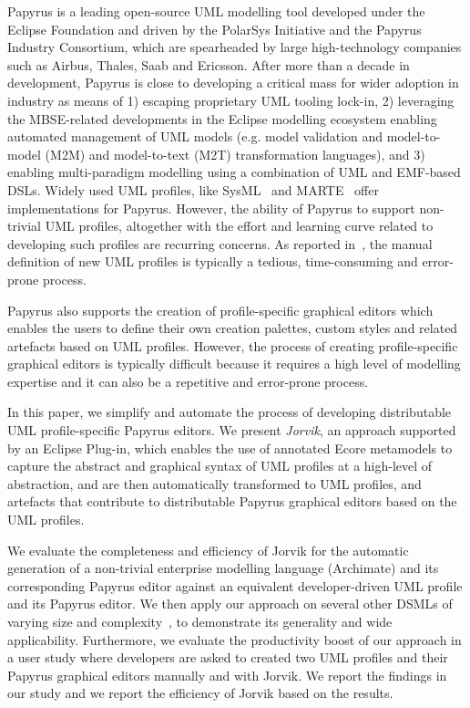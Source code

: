Papyrus \cite{lanusse2009papyrus} is a leading open-source UML modelling tool developed under the Eclipse Foundation and driven by the PolarSys Initiative and the Papyrus Industry Consortium, which are spearheaded by large high-technology companies such as Airbus, Thales, Saab and Ericsson.  
After more than a decade in development, Papyrus is close to developing a critical mass for wider adoption in industry as means of 1) escaping proprietary UML tooling lock-in, 2) leveraging the MBSE-related developments in the Eclipse modelling ecosystem enabling automated management of UML models (e.g. model validation and model-to-model (M2M) and model-to-text (M2T) transformation languages), and 3) enabling multi-paradigm modelling using a combination of UML and EMF-based DSLs. 
Widely used UML profiles, like SysML~\cite{friedenthal2014practical} and MARTE~\cite{omg2011marte} offer implementations for Papyrus. 
However, the ability of Papyrus to support non-trivial UML profiles, altogether with the effort and learning curve related to developing such profiles are recurring concerns. 
As reported in~\cite{Wimmer2009:IJWIS}, the manual definition of new UML profiles is typically a tedious, time-consuming and error-prone process.

Papyrus also supports the creation of profile-specific graphical editors which enables the users to define their own creation palettes, custom styles and related artefacts based on UML profiles. 
However, the process of creating profile-specific graphical editors is typically difficult because it requires a high level of modelling expertise and it can also be a repetitive and error-prone process.

In this paper, we simplify and automate the process of developing distributable UML profile-specific Papyrus editors. 
We present \textit{Jorvik}, an approach supported by an Eclipse Plug-in, which enables the use of annotated Ecore metamodels to capture the abstract and graphical syntax of UML profiles at a high-level of abstraction, and are then automatically transformed to UML profiles, and artefacts that contribute to distributable Papyrus graphical editors based on the UML profiles. 


We evaluate the completeness and efficiency of Jorvik for the automatic generation of a non-trivial enterprise modelling language (Archimate) and its corresponding Papyrus editor against an equivalent developer-driven UML profile and its Papyrus editor. 
We then apply our approach on several other DSMLs of varying size and complexity~\cite{williams2013metamodels}, to demonstrate its generality and wide applicability. 
Furthermore, we evaluate the productivity boost of our approach in a user study where developers are asked to created two UML profiles and their Papyrus graphical editors manually and with Jorvik.
We report the findings in our study and we report the efficiency of Jorvik based on the results. 

